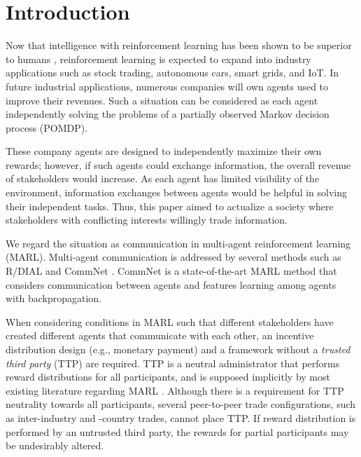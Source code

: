 \section{Introduction}

Now that intelligence with reinforcement learning has been shown to be superior to humans \citep{tesauro1995temporal,mnih2015human,silver2016mastering}, reinforcement learning is expected to expand into industry applications such as stock trading, autonomous cars, smart grids, and IoT. 
In future industrial applications, numerous companies will own agents used to improve their revenues.
Such a situation can be considered as each agent independently solving the problems of a partially observed Markov decision process (POMDP).

These company agents are designed to independently maximize their own rewards; 
however, if such agents could exchange information, the overall revenue of stakeholders would increase.
As each agent has limited visibility of the environment, information exchanges between agents would be helpful in solving their independent tasks.
Thus, this paper aimed to actualize a society where stakeholders with conflicting interests willingly trade information.

We regard the situation as communication in multi-agent reinforcement learning (MARL).
Multi-agent communication is addressed by several methods such as R/DIAL \citep{foerster2016learning} and CommNet \citep{sukhbaatar2016learning}.
CommNet is a state-of-the-art MARL method that considers communication between agents 
and features learning among agents with backpropagation.

When considering conditions in MARL such that different stakeholders have created different agents that communicate with each other, an incentive distribution design (e.g., monetary payment) and a framework without a {\em trusted third party} (TTP) are required.
TTP \citep{wu1999game,sandholm2002possibility} is a neutral administrator that performs reward distributions for all participants, and is supposed implicitly by most existing literature regarding MARL \citep{agogino2006quicr,foerster2016learning,sukhbaatar2016learning}.
Although there is a requirement for TTP neutrality towards all participants,
several peer-to-peer trade configurations, such as inter-industry and -country trades, cannot place TTP.
If reward distribution is performed by an untrusted third party, the rewards for partial participants may be undesirably altered.


